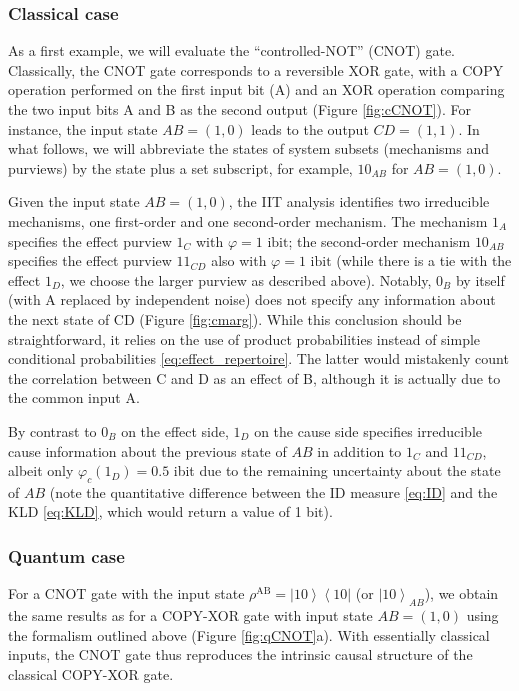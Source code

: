 \documentclass[preprints, article, accept, pdftex, moreauthors, letterpaper]{Definitions/mdpi}
\newcommand{\ket}[1]{\left| #1 \right>} %
\newcommand{\bra}[1]{\left< #1 \right|} %
\renewcommand{\=}[1]{\stackrel{#1}{=}} %
\renewcommand{\*}{\otimes}%
\begin{document}
\subsubsection{Classical case} 
As a first example, we will evaluate the ``controlled-NOT'' (CNOT) gate. Classically, the CNOT gate corresponds to a reversible XOR gate, with a COPY operation performed on the first input bit (A) and an XOR operation comparing the two input bits A and B as the second output (Figure \ref{fig:cCNOT}). For instance, the input state $AB = (1,0)$ leads to the output $CD = (1,1)$. In what follows, we will abbreviate the states of system subsets (mechanisms and purviews) by the state plus a set subscript, for example, $10_{AB}$ for $AB = (1,0)$. 

Given the input state $AB = (1,0)$, the IIT analysis identifies two irreducible mechanisms, one first-order and one second-order mechanism. The mechanism $1_A$ specifies the effect purview $1_C$ with $\varphi = 1 \text{ ibit}$; the second-order mechanism $10_{AB}$ specifies the effect purview $11_{CD}$ also with $\varphi = 1 \text{ ibit}$ (while there is a tie with the effect $1_{D}$, we choose the larger purview as described above). Notably, $0_B$ by itself (with A replaced by independent noise) does not specify any information about the next state of CD (Figure \ref{fig:cmarg}). While this conclusion should be straightforward, it relies on the use of product probabilities instead of simple conditional probabilities \eqref{eq:effect_repertoire}. The latter would mistakenly count the correlation between C and D as an effect of B, although it is actually due to the common input A. 

By contrast to $0_B$ on the effect side, $1_D$ on the cause side specifies irreducible cause information about the previous state of $AB$ in addition to $1_C$ and $11_{CD}$, albeit only $\varphi_c(1_D) = 0.5$ ibit due to the remaining uncertainty about the state of $AB$ (note the quantitative difference between the ID measure \eqref{eq:ID} and the KLD \eqref{eq:KLD}, which would return a value of 1 bit).

\subsubsection{Quantum case}
For a CNOT gate with the input state $\rho^{\text{AB}} = \ket{10}\bra{10}$ (or $\ket{10}_{AB}$), we obtain the same results as for a COPY-XOR gate with input state $AB=(1,0)$ using the formalism outlined above (Figure \ref{fig:qCNOT}a). With essentially classical inputs, the CNOT gate thus reproduces the intrinsic causal structure of the classical COPY-XOR gate. 
\end{document}

